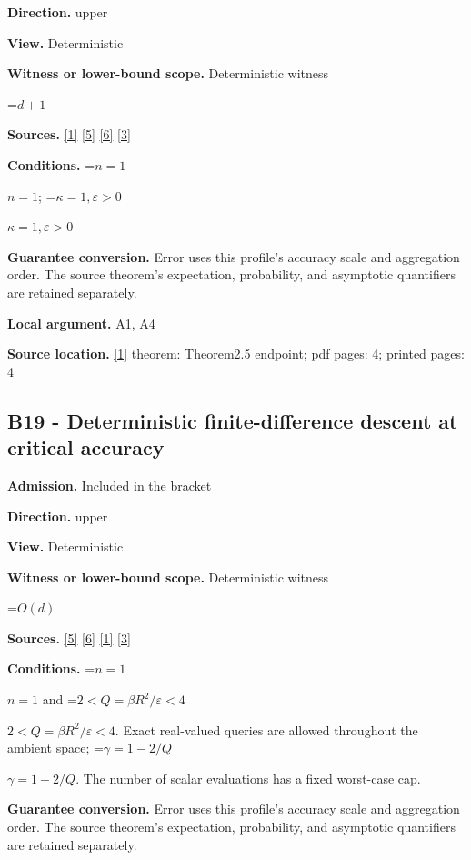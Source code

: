 \documentclass[10pt,a4paper]{article}
\newcommand{\AtlasMath}[1]{\par\begingroup\centering\setbox0=\hbox{$\displaystyle #1$}\ifdim\wd0>1.4\linewidth\typeout{ATLAS WIDE FORMULA: \the\wd0}\fi\ifdim\wd0>\linewidth\resizebox{\linewidth}{!}{\box0}\else\box0\fi\par\endgroup}
\newcommand{\AtlasInlineMath}[1]{\begingroup\setbox0=\hbox{$#1$}\ifdim\wd0>.4\linewidth\endgroup\AtlasMath{#1}\else\endgroup$#1$\fi}
\begin{document}
\textbf{Direction.} upper

\textbf{View.} Deterministic

\textbf{Witness or lower-bound scope.} Deterministic witness

\AtlasMath{d+1}
\textbf{Sources.} \href{https://arxiv.org/html/2610.00345v1}{[1]} \href{https://arxiv.org/html/2607.16558v2}{[5]} \href{https://www.mathnet.ru/php/archive.phtml?jrnid=mzm&option_lang=eng&paperid=1697&wshow=paper}{[6]} \href{https://arxiv.org/abs/2109.08858}{[3]}

\textbf{Conditions.} \AtlasInlineMath{n=1}; \AtlasInlineMath{\kappa=1,\varepsilon>0}

\textbf{Guarantee conversion.} Error uses this profile's accuracy scale and aggregation order. The source theorem's expectation, probability, and asymptotic quantifiers are retained separately.

\textbf{Local argument.} A1, A4

\textbf{Source location.} \href{https://arxiv.org/html/2610.00345v1}{[1]} theorem: Theorem2.5 endpoint; pdf pages: 4; printed pages: 4

\subsection{B19 - Deterministic finite-difference descent at critical accuracy}
\textbf{Admission.} Included in the bracket

\textbf{Direction.} upper

\textbf{View.} Deterministic

\textbf{Witness or lower-bound scope.} Deterministic witness

\AtlasMath{O(d)}
\textbf{Sources.} \href{https://arxiv.org/html/2607.16558v2}{[5]} \href{https://www.mathnet.ru/php/archive.phtml?jrnid=mzm&option_lang=eng&paperid=1697&wshow=paper}{[6]} \href{https://arxiv.org/html/2610.00345v1}{[1]} \href{https://arxiv.org/abs/2109.08858}{[3]}

\textbf{Conditions.} \AtlasInlineMath{n=1} and \AtlasInlineMath{2<Q=\beta R^2/\varepsilon<4}. Exact real-valued queries are allowed throughout the ambient space; \AtlasInlineMath{\gamma=1-2/Q}. The number of scalar evaluations has a fixed worst-case cap.

\textbf{Guarantee conversion.} Error uses this profile's accuracy scale and aggregation order. The source theorem's expectation, probability, and asymptotic quantifiers are retained separately.
\end{document}
